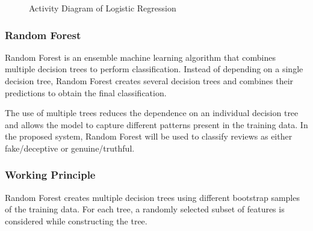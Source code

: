 \documentclass[12pt,a4paper]{report}
\begin{document}
\begin{figure}[H]

\caption{Activity Diagram of Logistic Regression}
\label{fig:logistic_activity}
\end{figure}



\subsubsection*{Random Forest}

Random Forest is an ensemble machine learning algorithm that combines multiple decision trees to perform classification. Instead of depending on a single decision tree, Random Forest creates several decision trees and combines their predictions to obtain the final classification.

The use of multiple trees reduces the dependence on an individual decision tree and allows the model to capture different patterns present in the training data. In the proposed system, Random Forest will be used to classify reviews as either fake/deceptive or genuine/truthful.

\subsubsection*{Working Principle}

Random Forest creates multiple decision trees using different bootstrap samples of the training data. For each tree, a randomly selected subset of features is considered while constructing the tree.
\end{document}
